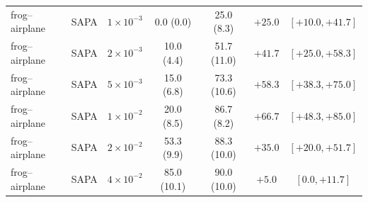 \begin{table}[p]
\begin{tabular}{llccccc}
frog--airplane & SAPA & $1{\times}10^{-3}$ & 0.0 (0.0) & 25.0 (8.3) & $+25.0$ & $[+10.0, +41.7]$ \\
frog--airplane & SAPA & $2{\times}10^{-3}$ & 10.0 (4.4) & 51.7 (11.0) & $+41.7$ & $[+25.0, +58.3]$ \\
frog--airplane & SAPA & $5{\times}10^{-3}$ & 15.0 (6.8) & 73.3 (10.6) & $+58.3$ & $[+38.3, +75.0]$ \\
frog--airplane & SAPA & $1{\times}10^{-2}$ & 20.0 (8.5) & 86.7 (8.2) & $+66.7$ & $[+48.3, +85.0]$ \\
frog--airplane & SAPA & $2{\times}10^{-2}$ & 53.3 (9.9) & 88.3 (10.0) & $+35.0$ & $[+20.0, +51.7]$ \\
frog--airplane & SAPA & $4{\times}10^{-2}$ & 85.0 (10.1) & 90.0 (10.0) & $+5.0$ & $[0.0, +11.7]$ \\

\bottomrule
\end{tabular}
\end{table}




